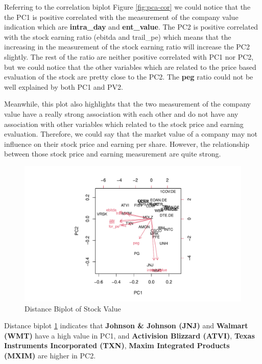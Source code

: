 \documentclass[11pt,a4paper,]{article}
\begin{document}
Referring to the correlation biplot Figure \ref{fig:pca-cor} we could notice that the the PC1 is positive correlated with the measurement of the company value indication which are \textbf{intra\_day} and \textbf{ent\_value}. The PC2 is positive correlated with the stock earning ratio (ebitda and trail\_pe) which means that the increasing in the measurement of the stock earning ratio will increase the PC2 slightly. The rest of the ratio are neither positive correlated with PC1 nor PC2, but we could notice that the other variables which are related to the price based evaluation of the stock are pretty close to the PC2. The \textbf{peg} ratio could not be well explained by both PC1 and PV2.

Meanwhile, this plot also highlights that the two measurement of the company value have a really strong association with each other and do not have any association with other variables which related to the stock price and earning evaluation. Therefore, we could say that the market value of a company may not influence on their stock price and earning per share. However, the relationship between those stock price and earning measurement are quite strong.

\begin{figure}
\centering
\includegraphics{ass2_files/figure-latex/bi-dis-1.pdf}
\caption{\label{fig:bi-dis}Distance Biplot of Stock Value}
\end{figure}

Distance biplot \ref{fig:bi-dis} indicates that \textbf{Johnson \& Johnson (JNJ)} and \textbf{Walmart (WMT)} have a high value in PC1, and \textbf{Activision Blizzard (ATVI)}, \textbf{Texas Instruments Incorporated (TXN)}, \textbf{Maxim Integrated Products (MXIM)} are higher in PC2.
\end{document}
